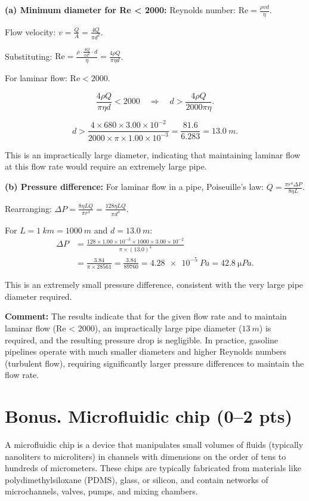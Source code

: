 \documentclass[11pt]{article}
\newcommand{\ans}[1]{\boxed{\displaystyle #1}}
\begin{document}
\textbf{(a) Minimum diameter for Re < 2000:} Reynolds number: $\text{Re} = \frac{\rho v d}{\eta}$.

Flow velocity: $v = \frac{Q}{A} = \frac{4Q}{\pi d^2}$.

Substituting: $\text{Re} = \frac{\rho \cdot \frac{4Q}{\pi d^2} \cdot d}{\eta} = \frac{4\rho Q}{\pi \eta d}$.

For laminar flow: $\text{Re} < 2000$.

\[ \frac{4\rho Q}{\pi \eta d} < 2000 \quad\Rightarrow\quad d > \frac{4\rho Q}{2000 \pi \eta}. \]

\[ d > \frac{4 \times 680 \times 3.00 \times 10^{-2}}{2000 \times \pi \times 1.00 \times 10^{-3}} = \frac{81.6}{6.283} = \ans{\SI{13.0}{m}}. \]

This is an impractically large diameter, indicating that maintaining laminar flow at this flow rate would require an extremely large pipe.

\textbf{(b) Pressure difference:} For laminar flow in a pipe, Poiseuille's law: $Q = \frac{\pi r^4 \Delta P}{8\eta L}$.

Rearranging: $\Delta P = \frac{8\eta L Q}{\pi r^4} = \frac{128\eta L Q}{\pi d^4}$.

For $L = \SI{1}{km} = \SI{1000}{m}$ and $d = \SI{13.0}{m}$:
\begin{align*}
\Delta P &= \frac{128 \times 1.00 \times 10^{-3} \times 1000 \times 3.00 \times 10^{-2}}{\pi \times (13.0)^4} \\
&= \frac{3.84}{\pi \times 28561} = \frac{3.84}{89760} = \ans{\SI{4.28e-5}{Pa} = \SI{42.8}{\micro Pa}}.
\end{align*}

This is an extremely small pressure difference, consistent with the very large pipe diameter required.

\textbf{Comment:} The results indicate that for the given flow rate and to maintain laminar flow (Re < 2000), an impractically large pipe diameter ($\SI{13}{m}$) is required, and the resulting pressure drop is negligible. In practice, gasoline pipelines operate with much smaller diameters and higher Reynolds numbers (turbulent flow), requiring significantly larger pressure differences to maintain the flow rate.

\section*{Bonus. Microfluidic chip (0--2 pts)}
A microfluidic chip is a device that manipulates small volumes of fluids (typically nanoliters to microliters) in channels with dimensions on the order of tens to hundreds of micrometers. These chips are typically fabricated from materials like polydimethylsiloxane (PDMS), glass, or silicon, and contain networks of microchannels, valves, pumps, and mixing chambers.
\end{document}
